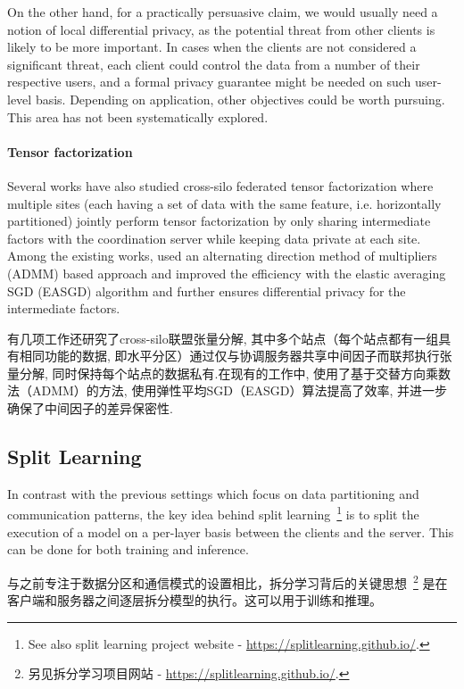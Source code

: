 On the other hand, for a practically persuasive claim, we would usually need a notion of local differential privacy, as the potential threat from other clients is likely to be more important. In cases when the clients are not considered a significant threat, each client could control the data from a number of their respective users, and a formal privacy guarantee might be needed on such user-level basis. Depending on application, other objectives could be worth pursuing. This area has not been systematically explored.

\paragraph{Tensor factorization} Several works have also studied cross-silo federated tensor factorization where multiple sites (each having a set of data with the same feature, i.e. horizontally partitioned) jointly perform tensor factorization by only sharing intermediate factors with the coordination server while keeping data private at each site. Among the existing works, \cite{DBLP:conf/kdd/KimSYJ17} used an alternating direction method of multipliers (ADMM) based approach and \cite{ma19cikm} improved the efficiency with the elastic averaging SGD (EASGD) algorithm and further ensures differential privacy for the intermediate factors.

有几项工作还研究了cross-silo联盟张量分解, 其中多个站点（每个站点都有一组具有相同功能的数据, 即水平分区）通过仅与协调服务器共享中间因子而联邦执行张量分解, 同时保持每个站点的数据私有.在现有的工作中,  \cite{DBLP:conf/kdd/KimSYJ17} 使用了基于交替方向乘数法（ADMM）的方法, \cite{ma19cikm} 使用弹性平均SGD（EASGD）算法提高了效率, 并进一步确保了中间因子的差异保密性.

\subsection{Split Learning}
\label{ssec:split-learning}

In contrast with the previous settings which focus on data partitioning and communication patterns, the key idea behind split learning~\citep{gupta2018distributed,vepakomma2018split}\footnote{See also split learning project website - \url{https://splitlearning.github.io/}.} is to split the execution of a model on a per-layer basis between the clients and the server. This can be done for both training and inference. 

与之前专注于数据分区和通信模式的设置相比，拆分学习背后的关键思想~\citep{gupta2018distributed,vepakomma2018split}\footnote{另见拆分学习项目网站 - \url{https://splitlearning.github.io/}.} 是在客户端和服务器之间逐层拆分模型的执行。这可以用于训练和推理。

